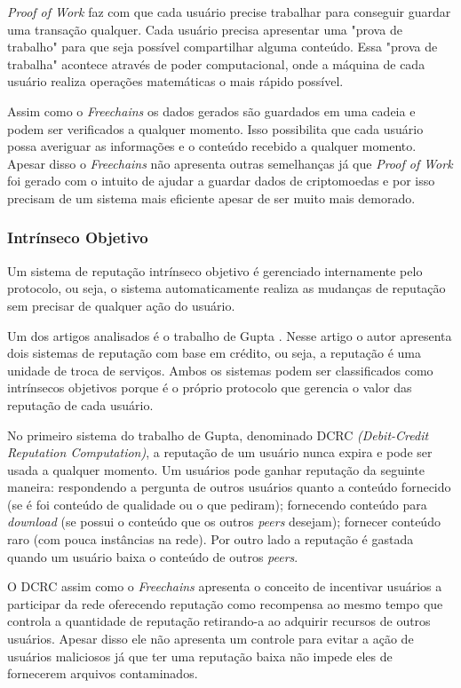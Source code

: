 \documentclass[12pt]{article}
\newcommand{\FC} {\emph{Freechains}\xspace}
\begin{document}
\emph{Proof of Work} faz com que cada usuário precise trabalhar para conseguir guardar uma transação qualquer. 
Cada usuário precisa apresentar uma "prova de trabalho" para que seja possível compartilhar alguma conteúdo. 
Essa "prova de trabalha" acontece através de poder computacional, onde a máquina de cada usuário realiza operações matemáticas o mais rápido possível.

Assim como o \FC os dados gerados são guardados em uma cadeia e podem ser verificados a qualquer momento. 
Isso possibilita que cada usuário possa averiguar as informações e o conteúdo recebido a qualquer momento. 
Apesar disso o \FC não apresenta outras semelhanças já que \emph{Proof of Work} foi gerado com o intuito de ajudar a guardar dados de criptomoedas e por isso precisam de um sistema mais eficiente apesar de ser muito mais demorado.


\subsubsection{Intrínseco Objetivo} \label{subsub:intobj}

Um sistema de reputação intrínseco objetivo é gerenciado internamente pelo protocolo, ou seja, o sistema automaticamente realiza as mudanças de reputação sem precisar de qualquer ação do usuário. 

Um dos artigos analisados é o trabalho de Gupta \cite{gupta2003reputation}. Nesse artigo o autor apresenta dois  sistemas de reputação com base em crédito, ou seja, a reputação é uma unidade de troca de serviços. 
Ambos os sistemas podem ser classificados como intrínsecos objetivos porque é o próprio protocolo que gerencia o valor das reputação de cada usuário.

No primeiro sistema do trabalho de Gupta, denominado DCRC \emph{(Debit-Credit Reputation Computation)}, a reputação de um usuário nunca expira e pode ser usada a qualquer momento. 
Um usuários pode ganhar reputação da seguinte maneira: respondendo a pergunta de outros usuários quanto a conteúdo fornecido (se é foi conteúdo de qualidade ou o que pediram); fornecendo conteúdo para \emph{download} (se possui o conteúdo que os outros \emph{peers} desejam); fornecer conteúdo raro (com pouca instâncias na rede). 
Por outro lado a reputação é gastada quando um usuário baixa o conteúdo de outros \emph{peers}.

O DCRC assim como o \FC apresenta o conceito de incentivar usuários a participar da rede oferecendo reputação como recompensa ao mesmo tempo que controla a quantidade de reputação retirando-a ao adquirir recursos de outros usuários. 
Apesar disso ele não apresenta um controle para evitar a ação de usuários maliciosos já que ter uma reputação baixa não impede eles de fornecerem arquivos contaminados.
\end{document}
